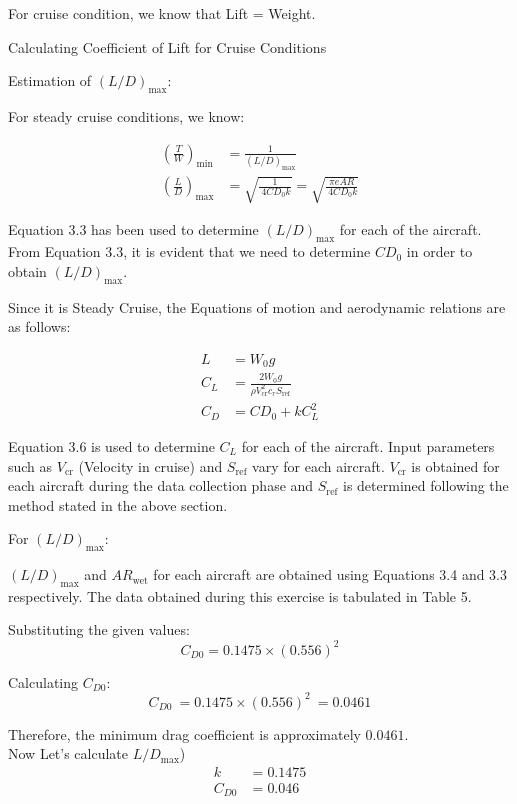 \documentclass[12 pt]{article}
\begin{document}
For cruise condition, we know that Lift = Weight.

{Calculating Coefficient of Lift for Cruise Conditions}

Estimation of $(L/D)_{\text{max}}$:

For steady cruise conditions, we know:

\begin{align}
\left(\frac{T}{W}\right)_{\min} &= \frac{1}{(L/D)_{\text{max}}} \tag{3.3} \\
\left(\frac{L}{D}\right)_{\text{max}} &= \sqrt{\frac{1}{\ 4CD_0 k}} = \sqrt{\frac{\pi e AR}{\ 4CD_0 k}} \tag{3.4}
\end{align}

Equation 3.3 has been used to determine $(L/D)_{\text{max}}$ for each of the aircraft. From Equation 3.3, it is evident that we need to determine $CD_0$ in order to obtain $(L/D)_{\text{max}}$.

Since it is Steady Cruise, the Equations of motion and aerodynamic relations are as follows:

\begin{align}
L &= W_0g \tag{3.5} \\
C_L &= \frac{2W_0g}{\rho V^2_{\text{cr}} c_r S_{\text{ref}}} \tag{3.6} \\
C_D &= CD_0 + kC_L^2 \tag{3.7}
\end{align}

Equation 3.6 is used to determine $C_L$ for each of the aircraft. Input parameters such as $V_{\text{cr}}$ (Velocity in cruise) and $S_{\text{ref}}$ vary for each aircraft. $V_{\text{cr}}$ is obtained for each aircraft during the data collection phase and $S_{\text{ref}}$ is determined following the method stated in the above section.

For $(L/D)_{\text{max}}$:

$(L/D)_{\text{max}}$ and $AR_{\text{wet}}$ for each aircraft are obtained using Equations 3.4 and 3.3 respectively. The data obtained during this exercise is tabulated in Table 5.

Substituting the given values:
\[
C_{D0} = 0.1475 \times (0.556)^2
\]

Calculating \( C_{D0} \):
\[
C_{D0} \ = 0.1475 \times (0.556)^2 \ = 0.0461
\]

Therefore, the minimum drag coefficient is approximately \(0.0461\).\\
Now Let's calculate \( L/D_{\text{max}} \))
\begin{align*}
    k & = 0.1475 \\
    C_{D0} & = 0.046
\end{align*}
\end{document}
